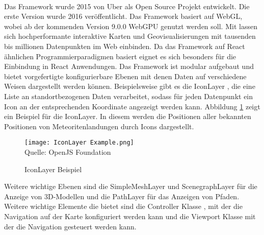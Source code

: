 \paragraph{\deckgl{}}
Das Framework \deckgl{} wurde 2015 von Uber als Open Source Projekt entwickelt. Die erste Version wurde 2016 veröffentlicht.\cite{Visgl} Das Framework basiert auf \ac{WebGL}, wobei ab der kommenden Version 9.0.0 WebGPU genutzt werden soll.\cite{Green2022} Mit \deckgl lassen sich hochperformante interaktive Karten und Geovisualisierungen mit tausenden bis millionen Datenpunkten im Web einbinden. Da das Framework auf React ähnlichen Programmierparadigmen basiert eignet es sich besonders für die Einbindung in React Anwendungen.\cite{Deckgl} Das Framework ist modular aufgebaut und bietet vorgefertigte konfigurierbare Ebenen mit denen Daten auf verschiedene Weisen dargestellt werden können.\cite{DeckglLayer} Beispielsweise gibt es die IconLayer \cite{DeckglIconLayer}, die eine Liste an standortbezogenen Daten verarbeitet, sodass für jeden Datenpunkt ein Icon an der entsprechenden Koordinate angezeigt werden kann. Abbildung \ref{fig:IconLayerExample} zeigt ein Beispiel für die IconLayer. In diesem werden die Positionen aller bekannten Positionen von Meteoritenlandungen durch Icons dargestellt.

\begin{figure}[H]
    \caption{IconLayer Beispiel}\label{fig:IconLayerExample}
    \texttt{[image: IconLayer Example.png]}
    \\
    Quelle: OpenJS Foundation \cite{DeckGlMeteorites}
\end{figure}

Weitere wichtige Ebenen sind die SimpleMeshLayer \cite{DeckglSimpleMeshLayer} und ScenegraphLayer \cite{DeckglScenegraphLayer} für die Anzeige von 3D-Modellen und die PathLayer für das Anzeigen von Pfaden. Weitere wichtige Elemente die \deckgl{} bietet sind die Controller Klasse \cite{DeckglController}, mit der die Navigation auf der Karte konfiguriert werden kann und die Viewport Klasse \cite{DeckglViewport} mit der die Navigation gesteuert werden kann.

